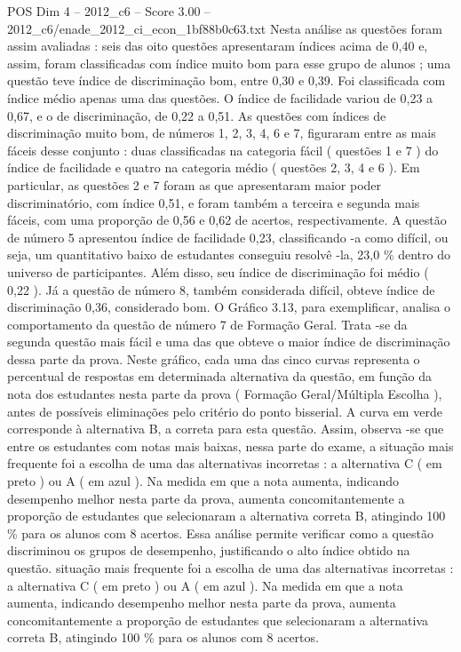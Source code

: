 \begin{textsample}{POS Dim 4 – 2012\_c6 – Score 3.00 – 2012\_c6/enade\_2012\_ci\_econ\_1bf88b0c63.txt}
Nesta análise as questões foram assim avaliadas : seis das oito questões apresentaram índices acima de 0,40 e, assim, foram classificadas com índice muito bom para esse grupo de alunos ; uma questão teve índice de discriminação bom, entre 0,30 e 0,39.
Foi classificada com índice médio apenas uma das questões.
O índice de facilidade variou de 0,23 a 0,67, e o de discriminação, de 0,22 a 0,51.
As questões com índices de discriminação muito bom, de números 1, 2, 3, 4, 6 e 7, figuraram entre as mais fáceis desse conjunto : duas classificadas na categoria fácil ( questões 1 e 7 ) do índice de facilidade e quatro na categoria médio ( questões 2, 3, 4 e 6 ).
Em particular, as questões 2 e 7 foram as que apresentaram maior poder discriminatório, com índice 0,51, e foram também a terceira e segunda mais fáceis, com uma proporção de 0,56 e 0,62 de acertos, respectivamente.
A questão de número 5 apresentou índice de facilidade 0,23, classificando -a como difícil, ou seja, um quantitativo baixo de estudantes conseguiu resolvê -la, 23,0 \% dentro do universo de participantes.
Além disso, seu índice de discriminação foi médio ( 0,22 ).
Já a questão de número 8, também considerada difícil, obteve índice de discriminação 0,36, considerado bom.
O Gráfico 3.13, para exemplificar, analisa o comportamento da questão de número 7 de Formação Geral.
Trata -se da segunda questão mais fácil e uma das que obteve o maior índice de discriminação dessa parte da prova.
Neste gráfico, cada uma das cinco curvas representa o percentual de respostas em determinada alternativa da questão, em função da nota dos estudantes nesta parte da prova ( Formação Geral/Múltipla Escolha ), antes de possíveis eliminações pelo critério do ponto bisserial.
A curva em verde corresponde à alternativa B, a correta para esta questão.
Assim, observa -se que entre os estudantes com notas mais baixas, nessa parte do exame, a situação mais frequente foi a escolha de uma das alternativas incorretas : a alternativa C ( em preto ) ou A ( em azul ).
Na medida em que a nota aumenta, indicando desempenho melhor nesta parte da prova, aumenta concomitantemente a proporção de estudantes que selecionaram a alternativa correta B, atingindo 100 \% para os alunos com 8 acertos.
Essa análise permite verificar como a questão discriminou os grupos de desempenho, justificando o alto índice obtido na questão. situação mais frequente foi a escolha de uma das alternativas incorretas : a alternativa C ( em preto ) ou A ( em azul ).
Na medida em que a nota aumenta, indicando desempenho melhor nesta parte da prova, aumenta concomitantemente a proporção de estudantes que selecionaram a alternativa correta B, atingindo 100 \% para os alunos com 8 acertos.

\end{textsample}
